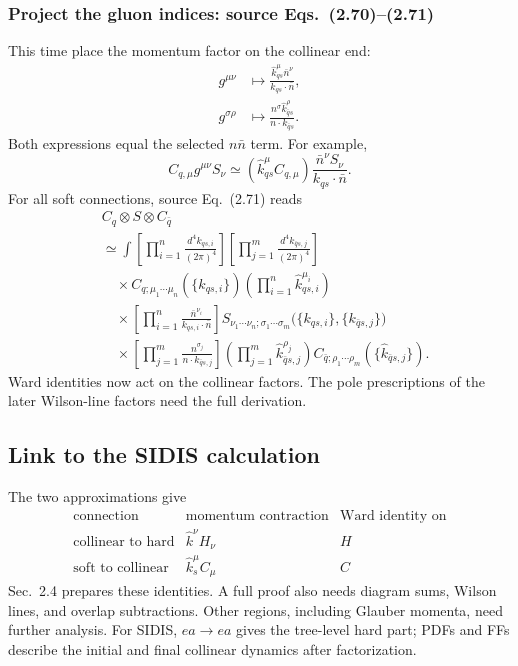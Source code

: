 \documentclass[14pt,a4paper]{extarticle}
\numberwithin{equation}{section}
\begin{document}
\subsubsection{Project the gluon indices: source Eqs.~(2.70)--(2.71)}
This time place the momentum factor on the collinear end:
\begin{align}
 g^{\mu\nu}&\longmapsto
 \frac{\hat k_{qs}^\mu\bar n^\nu}{k_{qs}\cdot\bar n},\\
 g^{\sigma\rho}&\longmapsto
 \frac{n^\sigma\hat k_{\bar qs}^\rho}{n\cdot k_{\bar qs}}.
\end{align}
Both expressions equal the selected $n\bar n$ term. For example,
\begin{equation}
 C_{q,\mu}g^{\mu\nu}S_\nu\simeq
 (\hat k_{qs}^\mu C_{q,\mu})
 \frac{\bar n^\nu S_\nu}{k_{qs}\cdot\bar n}.
\end{equation}
For all soft connections, source Eq.~(2.71) reads
\begin{equation}
\begin{aligned}
 &C_q\otimes S\otimes C_{\bar q}\\
 &\simeq\int
 \left[\prod_{i=1}^{n}\frac{d^4k_{qs,i}}{(2\pi)^4}\right]
 \left[\prod_{j=1}^{m}\frac{d^4k_{\bar qs,j}}{(2\pi)^4}\right]\\
 &\quad\times C_{q;\mu_1\cdots\mu_n}
 (\{\hat k_{qs,i}\})
 \left(\prod_{i=1}^{n}\hat k_{qs,i}^{\mu_i}\right)\\
 &\quad\times\left[\prod_{i=1}^{n}
 \frac{\bar n^{\nu_i}}{k_{qs,i}\cdot\bar n}\right]
 S_{\nu_1\cdots\nu_n;\sigma_1\cdots\sigma_m}
 \bigl(\{k_{qs,i}\},\{k_{\bar qs,j}\}\bigr)\\
 &\quad\times\left[\prod_{j=1}^{m}
 \frac{n^{\sigma_j}}{n\cdot k_{\bar qs,j}}\right]
 \left(\prod_{j=1}^{m}\hat k_{\bar qs,j}^{\rho_j}\right)
 C_{\bar q;\rho_1\cdots\rho_m}(\{\hat k_{\bar qs,j}\}).
\end{aligned}
\label{eq:notes-full-soft-connections}
\end{equation}
Ward identities now act on the collinear factors. The pole prescriptions
of the later Wilson-line factors need the full derivation.

\subsection{Link to the SIDIS calculation}
The two approximations give
\begin{equation}
 \begin{array}{c|c|c}
 \text{connection}&\text{momentum contraction}&\text{Ward identity on}\\\hline
 \text{collinear to hard}&\hat k^\nu H_\nu&H\\
 \text{soft to collinear}&\hat k_s^\mu C_\mu&C
 \end{array}
\end{equation}
Sec.~2.4 prepares these identities. A full proof also needs diagram sums,
Wilson lines, and overlap subtractions. Other regions, including Glauber
momenta, need further analysis.
For SIDIS, $ea\to ea$ gives the tree-level hard part; PDFs and FFs
describe the initial and final collinear dynamics after factorization.
\end{document}
